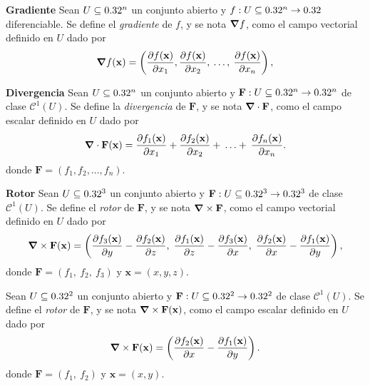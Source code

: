 \begin{definition}\textbf{Gradiente}
    Sean  $U  \subseteq  0.32^n$ un conjunto abierto y   $f:U  \subseteq  0.32^n\to0.32$ diferenciable.   Se define el \emph{gradiente} de $f$, y se nota $\grad f$,  como el  campo vectorial definido en $U$  dado por
    \[
        \grad f(\mathbf{x})=\left(\frac{\partial f(\mathbf{x})}{\partial x_1},\frac{\partial f(\mathbf{x})}{\partial x_2},\:\ldots,\: \frac{\partial f(\mathbf{x})}{\partial x_n}\right),
    \]
  \end{definition}


\begin{definition}\textbf{Divergencia}
    Sean  $U  \subseteq  0.32^n$ un conjunto abierto y  $\mathbf{F}:U  \subseteq  0.32^n\to0.32^n$  de clase $\mathcal{C}^1(U)$.  Se define la \emph{divergencia} de $\mathbf{F}$, y se nota  $ \grad\cdot \mathbf{F}$,  como el  campo escalar definido en $U$  dado por
    \[
        \grad\cdot \mathbf{F}(\mathbf{x})=\frac{\partial f_1(\mathbf{x})}{\partial x_1}+\frac{\partial f_2(\mathbf{x})}{\partial x_2}+\:\ldots+\: \frac{\partial f_n(\mathbf{x})}{\partial x_n}.
    \]
    donde $\mathbf{F}=(f_1,f_2,\ldots,f_n).$ 
\end{definition}


\begin{definition}\textbf{Rotor}
   Sean  $U  \subseteq  0.32^3$ un conjunto abierto  y  $\mathbf{F}:U  \subseteq  0.32^3\to0.32^3$ de clase $\mathcal{C}^1(U)$.  Se define el \emph{rotor} de $\mathbf{F}$, y se nota  $\grad\times\mathbf{F}$,   como el  campo vectorial  definido en $U$ dado por 
    \[
        \grad\times\mathbf{F}(\mathbf{x})=\left(\frac{\partial f_3(\mathbf{x})}{\partial y}-\frac{\partial f_2(\mathbf{x})}{\partial z},\;\frac{\partial f_1(\mathbf{x})}{\partial z}-\frac{\partial f_3(\mathbf{x})}{\partial x},\;\frac{\partial f_2(\mathbf{x})}{\partial x}-\frac{\partial f_1(\mathbf{x})}{\partial y}\right),
    \]   
    donde $\mathbf{F}=(f_1,\:f_2,\:f_3)$ y $\mathbf{x}=(x,y,z)$.
  
  
    Sean  $U  \subseteq  0.32^2$ un conjunto abierto y  $\mathbf{F}:U  \subseteq  0.32^2\to0.32^2$  de clase $\mathcal{C}^1(U)$.  Se define el \emph{rotor} de $\mathbf{F}$, y se nota  $\grad\times\mathbf{F}(\mathbf{x})$,   como el campo escalar  definido en $U$  dado por
    \[
        \grad\times\mathbf{F}(\mathbf{x})=\left(\frac{\partial f_2(\mathbf{x})}{\partial x}-\frac{\partial f_1(\mathbf{x})}{\partial y}\right).
    \]
     donde $\mathbf{F}=(f_1,\:f_2)$ y $\mathbf{x}=(x,y)$.
\end{definition}

